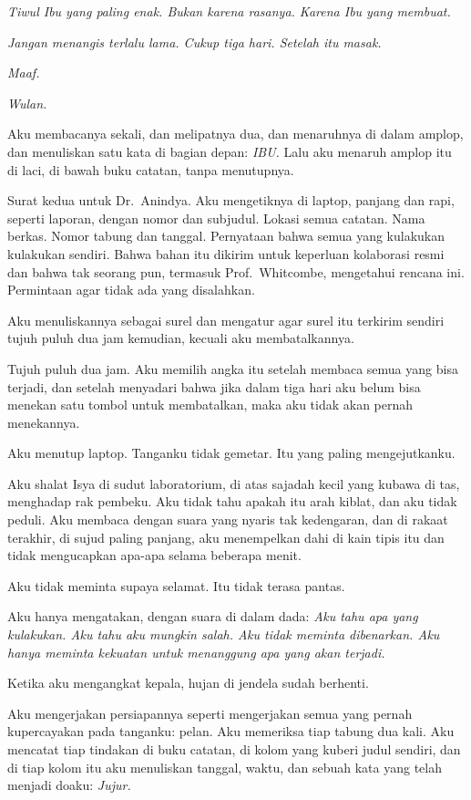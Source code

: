 \documentclass[11pt,twoside,openany]{book}
\makeatletter
\newcommand{\scenebreak}{\par\vspace{0.9em}{\centering\textsc{*\hspace{0.7em}*\hspace{0.7em}*}\par}\vspace{0.9em}\@afterindentfalse\@afterheading}
\makeatother
\begin{document}
\emph{Tiwul Ibu yang paling enak. Bukan karena rasanya. Karena Ibu yang membuat.}

\emph{Jangan menangis terlalu lama. Cukup tiga hari. Setelah itu masak.}

\emph{Maaf.}

\emph{Wulan.}

Aku membacanya sekali, dan melipatnya dua, dan menaruhnya di dalam amplop, dan menuliskan satu kata di bagian depan: \emph{IBU.} Lalu aku menaruh amplop itu di laci, di bawah buku catatan, tanpa menutupnya.

Surat kedua untuk Dr.~Anindya. Aku mengetiknya di laptop, panjang dan rapi, seperti laporan, dengan nomor dan subjudul. Lokasi semua catatan. Nama berkas. Nomor tabung dan tanggal. Pernyataan bahwa semua yang kulakukan kulakukan sendiri. Bahwa bahan itu dikirim untuk keperluan kolaborasi resmi dan bahwa tak seorang pun, termasuk Prof.~Whitcombe, mengetahui rencana ini. Permintaan agar tidak ada yang disalahkan.

Aku menuliskannya sebagai surel dan mengatur agar surel itu terkirim sendiri tujuh puluh dua jam kemudian, kecuali aku membatalkannya.

Tujuh puluh dua jam. Aku memilih angka itu setelah membaca semua yang bisa terjadi, dan setelah menyadari bahwa jika dalam tiga hari aku belum bisa menekan satu tombol untuk membatalkan, maka aku tidak akan pernah menekannya.

Aku menutup laptop. Tanganku tidak gemetar. Itu yang paling mengejutkanku.

\scenebreak
Aku shalat Isya di sudut laboratorium, di atas sajadah kecil yang kubawa di tas, menghadap rak pembeku. Aku tidak tahu apakah itu arah kiblat, dan aku tidak peduli. Aku membaca dengan suara yang nyaris tak kedengaran, dan di rakaat terakhir, di sujud paling panjang, aku menempelkan dahi di kain tipis itu dan tidak mengucapkan apa-apa selama beberapa menit.

Aku tidak meminta supaya selamat. Itu tidak terasa pantas.

Aku hanya mengatakan, dengan suara di dalam dada: \emph{Aku tahu apa yang kulakukan. Aku tahu aku mungkin salah. Aku tidak meminta dibenarkan. Aku hanya meminta kekuatan untuk menanggung apa yang akan terjadi.}

Ketika aku mengangkat kepala, hujan di jendela sudah berhenti.

\scenebreak
Aku mengerjakan persiapannya seperti mengerjakan semua yang pernah kupercayakan pada tanganku: pelan. Aku memeriksa tiap tabung dua kali. Aku mencatat tiap tindakan di buku catatan, di kolom yang kuberi judul sendiri, dan di tiap kolom itu aku menuliskan tanggal, waktu, dan sebuah kata yang telah menjadi doaku: \emph{Jujur.}
\end{document}
